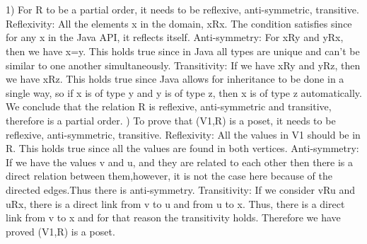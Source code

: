 \documentclass{article}
\begin{document}
\section{}
\subsection{}
1)
For R to be a partial order, it needs to be reflexive, anti-symmetric, transitive. 
\newline \newline
Reflexivity: 
All the elements x in the domain, xRx. The condition satisfies since for any x in the Java API, it reflects itself. 
\newline \newline
Anti-symmetry: 
For xRy and yRx, then we have x=y. This holds true since in Java all types are unique and can't be similar to one another simultaneously. 
\newline \newline
Transitivity: 
If we have xRy and yRz, then we have xRz. This holds true since Java allows for inheritance to be done in a single way, so if x is of type y and y is of type z, then x is of type z automatically. 
\newline \newline
We conclude that the relation R is reflexive, anti-symmetric and transitive, therefore is a partial order. 
\newline {}) 
To prove that (V1,R) is a poset, it needs to be reflexive, anti-symmetric, transitive. 
\newline \newline
Reflexivity: 
All the values in V1 should be in R. This holds true since all the values are found in both vertices. 
\newline \newline
Anti-symmetry: 
 If we have the values v and u, and they are related to each other then there is a direct relation between them,however, it is not the case here because of the directed edges.Thus there is anti-symmetry. 
\newline \newline
Transitivity: 
If we consider vRu and uRx, there is a direct link from v to u and from u to x. Thus, there is a direct link from v to x and for that reason the transitivity holds. 
\newline \newline
Therefore we have proved (V1,R) is a poset. 
\newline\newline
\end{document}
